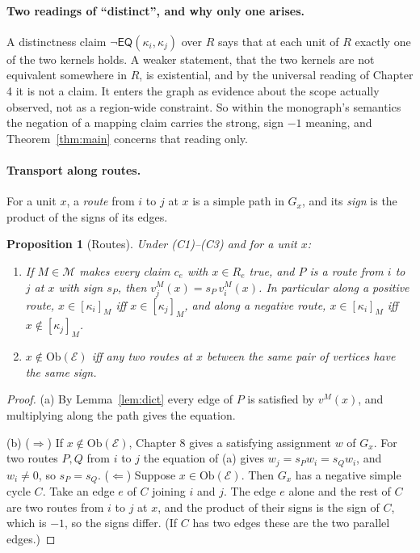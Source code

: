 \documentclass[11pt]{article}
\theoremstyle{plain}
\newtheorem{proposition}[theorem]{Proposition}
\theoremstyle{definition}
\theoremstyle{remark}
\newcommand{\Ob}{\mathrm{Ob}}
\newcommand{\EQ}{\mathsf{EQ}}
\newcommand{\nk}[1]{\neg#1}
\newcommand{\ext}[2]{[#1]_{#2}}
\begin{document}
\paragraph{Two readings of ``distinct'', and why only one arises.} A distinctness claim $\nk{\EQ(\kappa_i,\kappa_j)}$ over $R$ says that at each unit of $R$ exactly one of the two kernels holds. A weaker statement, that the two kernels are not equivalent somewhere in $R$, is existential, and by the universal reading of Chapter 4 it is not a claim. It enters the graph as evidence about the scope actually observed, not as a region-wide constraint. So within the monograph's semantics the negation of a mapping claim carries the strong, sign $-1$ meaning, and Theorem~\ref{thm:main} concerns that reading only.

\paragraph{Transport along routes.} For a unit $x$, a \emph{route} from $i$ to $j$ at $x$ is a simple path in $G_x$, and its \emph{sign} is the product of the signs of its edges.

\begin{proposition}[Routes]\label{prop:routes}
Under (C1)--(C3) and for a unit $x$:
\begin{enumerate}[label=(\alph*)]
\item If $M\in\mathcal M$ makes every claim $c_e$ with $x\in R_e$ true, and $P$ is a route from $i$ to $j$ at $x$ with sign $s_P$, then $v^M_j(x)=s_P\,v^M_i(x)$. In particular along a positive route, $x\in\ext{\kappa_i}{M}$ iff $x\in\ext{\kappa_j}{M}$, and along a negative route, $x\in\ext{\kappa_i}{M}$ iff $x\notin\ext{\kappa_j}{M}$.
\item $x\notin\Ob(\mathcal E)$ iff any two routes at $x$ between the same pair of vertices have the same sign.
\end{enumerate}
\end{proposition}

\begin{proof}
(a) By Lemma~\ref{lem:dict} every edge of $P$ is satisfied by $v^M(x)$, and multiplying along the path gives the equation.

(b) ($\Rightarrow$) If $x\notin\Ob(\mathcal E)$, Chapter 8 gives a satisfying assignment $w$ of $G_x$. For two routes $P,Q$ from $i$ to $j$ the equation of (a) gives $w_j=s_Pw_i=s_Qw_i$, and $w_i\ne0$, so $s_P=s_Q$. ($\Leftarrow$) Suppose $x\in\Ob(\mathcal E)$. Then $G_x$ has a negative simple cycle $C$. Take an edge $e$ of $C$ joining $i$ and $j$. The edge $e$ alone and the rest of $C$ are two routes from $i$ to $j$ at $x$, and the product of their signs is the sign of $C$, which is $-1$, so the signs differ. (If $C$ has two edges these are the two parallel edges.)
\end{proof}
\end{document}
